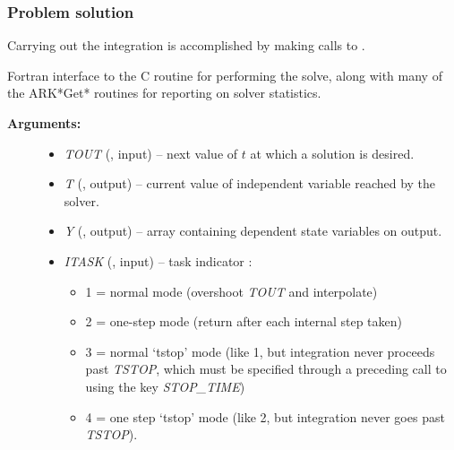 \documentclass[letterpaper,10pt,english]{sphinxmanual}
\begin{document}
\subsubsection{Problem solution}
\label{f_interface/Usage:finterface-solution}\label{f_interface/Usage:problem-solution}
Carrying out the integration is accomplished by making calls to
{\hyperref[f_interface/Usage:f/_/FARKODE]{}}.

\begin{fulllineitems}
\label{f_interface/Usage:f/_/FARKODE}
Fortran interface to the C routine {\hyperref[c_interface/User_callable:ARKode]{}}
for performing the solve, along with many of the ARK*Get*
routines for reporting on solver statistics.
\begin{description}
\item[{\textbf{Arguments:}}] \leavevmode\begin{itemize}
\item {} 
\emph{TOUT} (, input) -- next value of $t$ at
which a solution is desired.

\item {} 
\emph{T} (, output) -- current value of independent
variable reached by the solver.

\item {} 
\emph{Y} (, output) -- array containing dependent state
variables on output.

\item {} 
\emph{ITASK} (, input) -- task indicator :
\begin{itemize}
\item {} 
1 = normal mode (overshoot \emph{TOUT} and interpolate)

\item {} 
2 = one-step mode (return after each internal step taken)

\item {} 
3 = normal `tstop' mode (like 1, but integration never
proceeds past \emph{TSTOP}, which must be specified through a
preceding call to {\hyperref[f_interface/Usage:f/_/FARKSETRIN]{}} using the key
\emph{STOP\_TIME})

\item {} 
4 = one step `tstop' mode (like 2, but integration never
goes past \emph{TSTOP}).


\end{itemize}
\end{itemize}
\end{description}
\end{fulllineitems}
\end{document}
